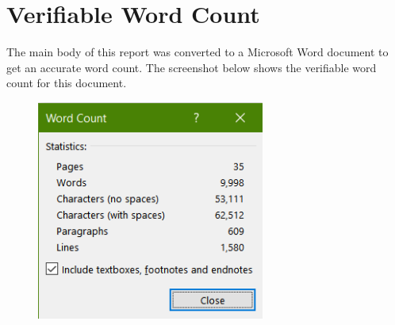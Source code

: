 \chapter{Verifiable Word Count}

The main body of this report was converted to a Microsoft Word document to get an accurate word count. The screenshot below shows the verifiable word count for this document.


\begin{figure}[!htb]
    \includegraphics[width=7.5cm,center]{Figures/wordCount.png}
\end{figure}